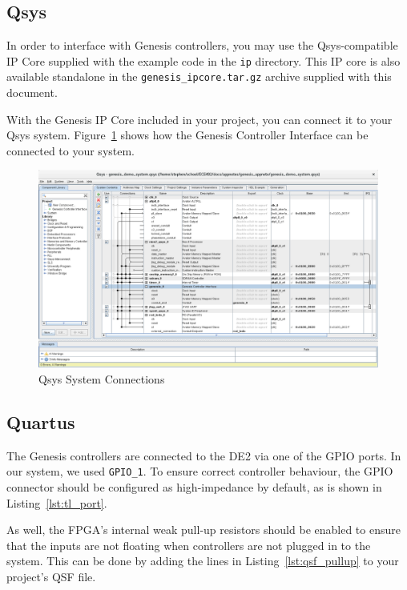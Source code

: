 \documentclass{capstonedoc}
\begin{document}
\subsection{Qsys}

In order to interface with Genesis controllers, you may use the Qsys-compatible
IP Core supplied with the example code in the \texttt{ip} directory. This IP
core is also available standalone in the \texttt{genesis\_ipcore.tar.gz} archive
supplied with this document.

With the Genesis IP Core included in your project, you can connect it to your
Qsys system. Figure~\ref{fig:qsys_system} shows how the Genesis Controller
Interface can be connected to your system.

\begin{figure}[h]
  \centering
  \includegraphics[width=\textwidth]{qsys_system}
  \caption{Qsys System Connections}
  \label{fig:qsys_system}
\end{figure}

\subsection{Quartus}

The Genesis controllers are connected to the DE2 via one of the GPIO ports. In
our system, we used \texttt{GPIO\_1}. To ensure correct controller behaviour,
the GPIO connector should be configured as high-impedance by default, as is
shown in Listing~\ref{lst:tl_port}.

As well, the FPGA's internal weak pull-up resistors should be enabled to ensure
that the inputs are not floating when controllers are not plugged in to the
system. This can be done by adding the lines in Listing~\ref{lst:qsf_pullup} to
your project's QSF file.
\end{document}
